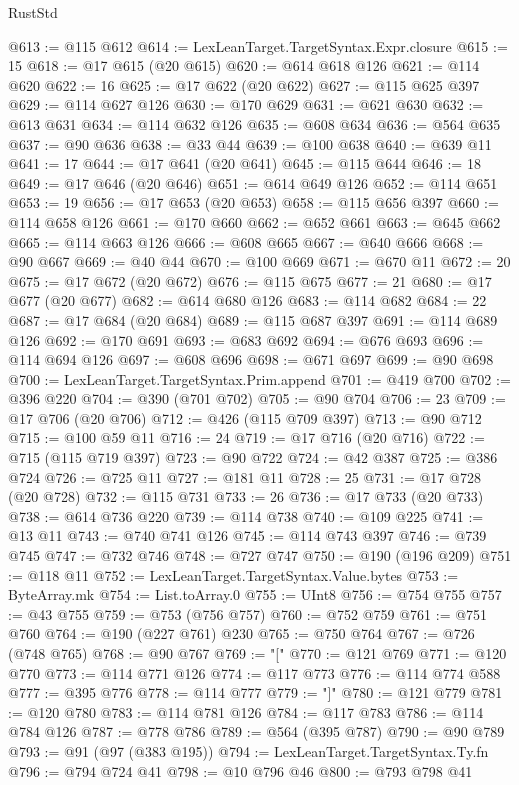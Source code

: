 \begin{lexlean}{RustStd}
\begin{coremodule}
@613 := @115 @612
@614 := LexLeanTarget.TargetSyntax.Expr.closure
@615 := 15
@618 := @17 @615 (@20 @615)
@620 := @614 @618 @126
@621 := @114 @620
@622 := 16
@625 := @17 @622 (@20 @622)
@627 := @115 @625 @397
@629 := @114 @627 @126
@630 := @170 @629
@631 := @621 @630
@632 := @613 @631
@634 := @114 @632 @126
@635 := @608 @634
@636 := @564 @635
@637 := @90 @636
@638 := @33 @44
@639 := @100 @638
@640 := @639 @11
@641 := 17
@644 := @17 @641 (@20 @641)
@645 := @115 @644
@646 := 18
@649 := @17 @646 (@20 @646)
@651 := @614 @649 @126
@652 := @114 @651
@653 := 19
@656 := @17 @653 (@20 @653)
@658 := @115 @656 @397
@660 := @114 @658 @126
@661 := @170 @660
@662 := @652 @661
@663 := @645 @662
@665 := @114 @663 @126
@666 := @608 @665
@667 := @640 @666
@668 := @90 @667
@669 := @40 @44
@670 := @100 @669
@671 := @670 @11
@672 := 20
@675 := @17 @672 (@20 @672)
@676 := @115 @675
@677 := 21
@680 := @17 @677 (@20 @677)
@682 := @614 @680 @126
@683 := @114 @682
@684 := 22
@687 := @17 @684 (@20 @684)
@689 := @115 @687 @397
@691 := @114 @689 @126
@692 := @170 @691
@693 := @683 @692
@694 := @676 @693
@696 := @114 @694 @126
@697 := @608 @696
@698 := @671 @697
@699 := @90 @698
@700 := LexLeanTarget.TargetSyntax.Prim.append
@701 := @419 @700
@702 := @396 @220
@704 := @390 (@701 @702)
@705 := @90 @704
@706 := 23
@709 := @17 @706 (@20 @706)
@712 := @426 (@115 @709 @397)
@713 := @90 @712
@715 := @100 @59 @11
@716 := 24
@719 := @17 @716 (@20 @716)
@722 := @715 (@115 @719 @397)
@723 := @90 @722
@724 := @42 @387
@725 := @386 @724
@726 := @725 @11
@727 := @181 @11
@728 := 25
@731 := @17 @728 (@20 @728)
@732 := @115 @731
@733 := 26
@736 := @17 @733 (@20 @733)
@738 := @614 @736 @220
@739 := @114 @738
@740 := @109 @225
@741 := @13 @11
@743 := @740 @741 @126
@745 := @114 @743 @397
@746 := @739 @745
@747 := @732 @746
@748 := @727 @747
@750 := @190 (@196 @209)
@751 := @118 @11
@752 := LexLeanTarget.TargetSyntax.Value.bytes
@753 := ByteArray.mk
@754 := List.toArray.{0}
@755 := UInt8
@756 := @754 @755
@757 := @43 @755
@759 := @753 (@756 @757)
@760 := @752 @759
@761 := @751 @760
@764 := @190 (@227 @761) @230
@765 := @750 @764
@767 := @726 (@748 @765)
@768 := @90 @767
@769 := "["
@770 := @121 @769
@771 := @120 @770
@773 := @114 @771 @126
@774 := @117 @773
@776 := @114 @774 @588
@777 := @395 @776
@778 := @114 @777
@779 := "]"
@780 := @121 @779
@781 := @120 @780
@783 := @114 @781 @126
@784 := @117 @783
@786 := @114 @784 @126
@787 := @778 @786
@789 := @564 (@395 @787)
@790 := @90 @789
@793 := @91 (@97 (@383 @195))
@794 := LexLeanTarget.TargetSyntax.Ty.fn
@796 := @794 @724 @41
@798 := @10 @796 @46
@800 := @793 @798 @41

\end{coremodule}
\end{lexlean}
